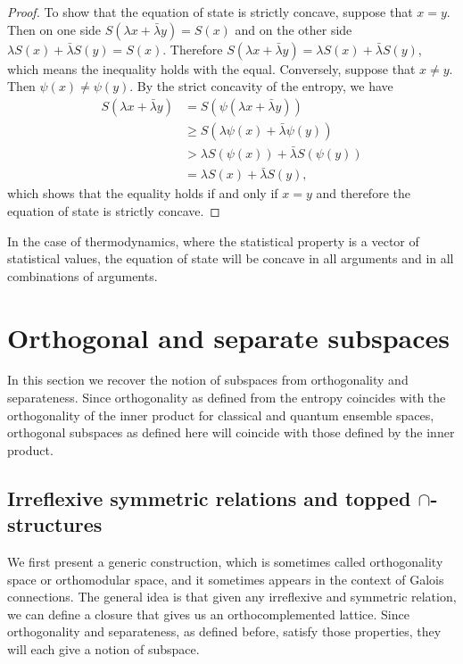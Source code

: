 \begin{mathSection}
\begin{proof}
	To show that the equation of state is strictly concave, suppose that $x=y$. Then on one side $S(\lambda x + \bar{\lambda} y) = S(x)$ and on the other side $\lambda S(x) + \bar{\lambda} S(y) = S(x)$. Therefore $S(\lambda x + \bar{\lambda} y) = \lambda S(x) + \bar{\lambda} S(y)$, which means the inequality holds with the equal. Conversely, suppose that $x\neq y$. Then $\psi(x) \neq \psi(y)$. By the strict concavity of the entropy, we have
	\begin{equation}
		\begin{aligned}
			S(\lambda x + \bar{\lambda} y) &= S(\psi(\lambda x + \bar{\lambda} y)) \\
			&\geq S(\lambda \psi(x) + \bar{\lambda} \psi(y)) \\
			&> \lambda S(\psi(x)) + \bar{\lambda} S(\psi(y)) \\
			&= \lambda S(x) + \bar{\lambda} S(y),
		\end{aligned}
	\end{equation}
	which shows that the equality holds if and only if $x=y$ and therefore the equation of state is strictly concave.
\end{proof}

\begin{remark}
	In the case of thermodynamics, where the statistical property is a vector of statistical values, the equation of state will be concave in all arguments and in all combinations of arguments.
\end{remark}
\end{mathSection}


\section{Orthogonal and separate subspaces}\label{pm-es-subspaceSection}

In this section we recover the notion of subspaces from orthogonality and separateness. Since orthogonality as defined from the entropy coincides with the orthogonality of the inner product for classical and quantum ensemble spaces, orthogonal subspaces as defined here will coincide with those defined by the inner product.

\subsection{Irreflexive symmetric relations and topped $\cap$-structures}

We first present a generic construction, which is sometimes called orthogonality space or orthomodular space, and it sometimes appears in the context of Galois connections. The general idea is that given any irreflexive and symmetric relation, we can define a closure that gives us an orthocomplemented lattice. Since orthogonality and separateness, as defined before, satisfy those properties, they will each give a notion of subspace.

